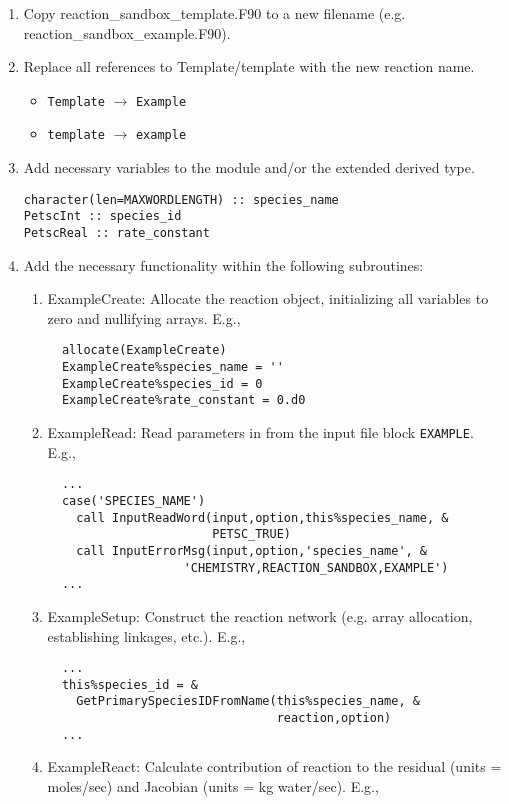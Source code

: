 \begin{enumerate}
  \item Copy reaction\_sandbox\_template.F90 to a new filename (e.g. reaction\_sandbox\_example.F90).
  \item Replace all references to Template/template with the new reaction name.
    \begin{itemize}
      \item[] \verb+Template+ $\rightarrow$ \verb+Example+
      \item[] \verb+template+ $\rightarrow$ \verb+example+
    \end{itemize}
  \item Add necessary variables to the module and/or the extended derived type.
\begin{verbatim}
character(len=MAXWORDLENGTH) :: species_name
PetscInt :: species_id
PetscReal :: rate_constant
\end{verbatim}
  \item Add the necessary functionality within the following subroutines:
    \begin{enumerate}[label=\alph*]
      \item[] ExampleCreate: Allocate the reaction object, initializing all variables to zero and nullifying arrays.  E.g.,
  \begin{verbatim}
  allocate(ExampleCreate)
  ExampleCreate%species_name = ''
  ExampleCreate%species_id = 0
  ExampleCreate%rate_constant = 0.d0
  \end{verbatim}
      \item ExampleRead: Read parameters in from the input file block \verb+EXAMPLE+.  E.g.,
  \begin{verbatim}
  ...
  case('SPECIES_NAME')
    call InputReadWord(input,option,this%species_name, &
                       PETSC_TRUE)
    call InputErrorMsg(input,option,'species_name', &
                   'CHEMISTRY,REACTION_SANDBOX,EXAMPLE')
  ...
  \end{verbatim}
      \item ExampleSetup: Construct the reaction network (e.g. array allocation, establishing linkages, etc.). E.g.,
  \begin{verbatim}
  ...
  this%species_id = &
    GetPrimarySpeciesIDFromName(this%species_name, &
                                reaction,option)
  ...
  \end{verbatim}
      \item ExampleReact: Calculate contribution of reaction to the residual (units = moles/sec) and Jacobian (units = kg water/sec). E.g.,

\end{enumerate}
\end{enumerate}
